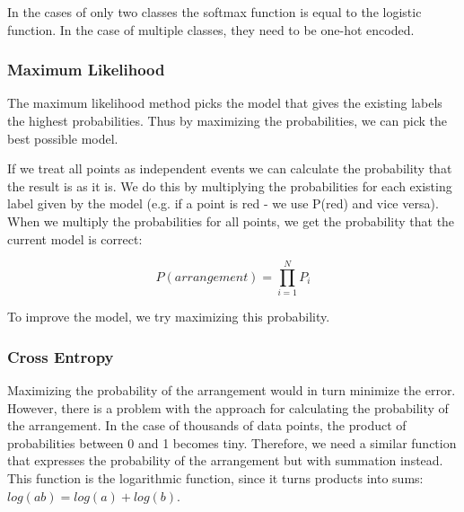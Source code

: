 \documentclass{article}
\begin{document}
In the cases of only two classes the softmax function is equal to the logistic function. In the case of multiple classes, they need to be one-hot encoded.

\subsubsection{Maximum Likelihood}
The maximum likelihood method picks the model that gives the existing labels the highest probabilities. Thus by maximizing the probabilities, we can pick the best possible model.

If we treat all points as independent events we can calculate the probability that the result is as it is. We do this by multiplying the probabilities for each existing label given by the model (e.g. if a point is red - we use P(red) and vice versa). When we multiply the probabilities for all points, we get the probability that the current model is correct:

\begin{equation}
  P(arrangement) = \prod_{i = 1}^{N} P_i
\end{equation}

To improve the model, we try maximizing this probability.

\subsubsection{Cross Entropy}
Maximizing the probability of the arrangement would in turn minimize the error. However, there is a problem with the approach for calculating the probability of the arrangement. In the case of thousands of data points, the product of probabilities between 0 and 1 becomes tiny. Therefore, we need a similar function that expresses the probability of the arrangement but with summation instead. This function is the logarithmic function, since it turns products into sums: $log(ab) = log(a) + log(b)$.
\end{document}

